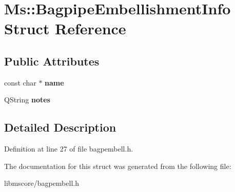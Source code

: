 \hypertarget{struct_ms_1_1_bagpipe_embellishment_info}{}\section{Ms\+:\+:Bagpipe\+Embellishment\+Info Struct Reference}
\label{struct_ms_1_1_bagpipe_embellishment_info}
\subsection*{Public Attributes}
\begin{DoxyCompactItemize}
\item 
\mbox{\label{struct_ms_1_1_bagpipe_embellishment_info_a49ab47e6204558027f6c6e0d5476be5a}} 
const char $\ast$ {\bfseries name}
\item 
\mbox{\label{struct_ms_1_1_bagpipe_embellishment_info_aec27eea76bb05ff5717e8c741a073b50}} 
Q\+String {\bfseries notes}
\end{DoxyCompactItemize}


\subsection{Detailed Description}


Definition at line 27 of file bagpembell.\+h.



The documentation for this struct was generated from the following file\+:\begin{DoxyCompactItemize}
\item 
libmscore/bagpembell.\+h\end{DoxyCompactItemize}
